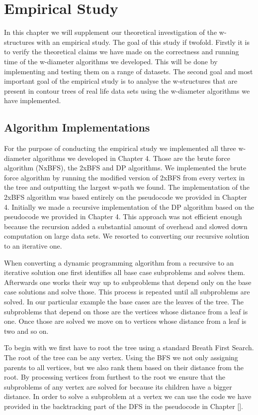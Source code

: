 \chapter{Empirical Study}
\label{chapter7}

In this chapter we will supplement our theoretical investigation of the w-structures with an empirical study. The goal of this study if twofold. Firstly it is to verify the theoretical claims we have made on the correctness and running time of the w-diameter algorithms we developed. This will be done by implementing and testing them on a range of datasets. The second goal and most important goal of the empirical study is to analyse the w-structures that are present in contour trees of real life data sets using the w-diameter algorithms we have implemented.

\section{Algorithm Implementations}

For the purpose of conducting the empirical study we implemented all three w-diameter algorithms we developed in Chapter 4. Those are the brute force algorithm (NxBFS), the 2xBFS and DP algorithms.  We implemented the brute force algorithm by running the modified version of 2xBFS from every vertex in the tree and outputting the largest w-path we found. The implementation of the 2xBFS algorithm was based entirely on the pseudocode we provided in Chapter 4. Initially we made a recursive implementation of the DP algorithm based on the pseudocode we provided in Chapter 4. This approach was not efficient enough because the recursion added a substantial amount of overhead and slowed down computation on large data sets. We resorted to converting our recursive solution to an iterative one.

When converting a dynamic programming algorithm from a recursive to an iterative solution one first identifies all base case subproblems and solves them. Afterwards one works their way up to subproblems that depend only on the base case solutions and solve those. This process is repeated until all subproblems are solved. In our particular example the base cases are the leaves of the tree. The subproblems that depend on those are the vertices whose distance from a leaf is one. Once those are solved we move on to vertices whose distance from a leaf is two and so on.

To begin with we first have to root the tree using a standard Breath First Search. The root of the tree can be any vertex. Using the BFS we not only assigning parents to all vertices, but we also rank them based on their distance from the root. By processing vertices from furthest to the root we ensure that the subproblems of any vertex are solved for because its children have a bigger distance. In order to solve a subproblem at a vertex we can use the code we have provided in the backtracking part of the DFS in the pseudocode in Chapter [].

